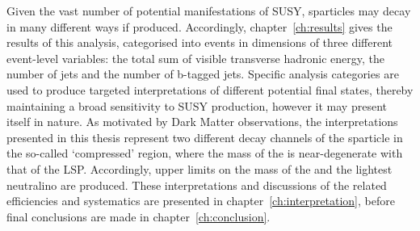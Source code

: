 Given the vast number of potential manifestations of SUSY, sparticles may
decay in many different ways if produced. Accordingly, chapter~\ref{ch:results}
gives the results of this analysis, categorised into events in dimensions of
three different event-level variables: the total sum of visible transverse
hadronic energy, the number of jets and the number of b-tagged jets.
Specific analysis categories are used to produce targeted
interpretations of different potential final states, thereby maintaining a broad
sensitivity to SUSY production, however it may present itself in nature. As
motivated by Dark Matter observations, the interpretations presented in this
thesis represent two different decay channels of the \sTop
sparticle in the so-called `compressed' region, where the mass of the \sTop is
near-degenerate with that of the LSP. Accordingly, upper limits on the mass of
the \sTop and the lightest neutralino are produced. These interpretations
and discussions of the related efficiencies and systematics are presented in
chapter~\ref{ch:interpretation}, before final conclusions are made in
chapter~\ref{ch:conclusion}.

